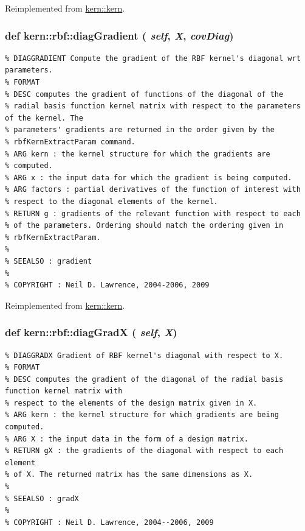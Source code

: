 Reimplemented from \hyperlink{classkern_1_1kern}{kern::kern}.\hypertarget{classkern_1_1rbf_0bcf6593046cfb84aef5f9e19b8c5ab5}{
\subsubsection[{diagGradient}]{\setlength{\rightskip}{0pt plus 5cm}def kern::rbf::diagGradient ( {\em self}, \/   {\em X}, \/   {\em covDiag})}}
\label{classkern_1_1rbf_0bcf6593046cfb84aef5f9e19b8c5ab5}




\footnotesize\begin{verbatim}% DIAGGRADIENT Compute the gradient of the RBF kernel's diagonal wrt parameters.
% FORMAT
% DESC computes the gradient of functions of the diagonal of the
% radial basis function kernel matrix with respect to the parameters of the kernel. The
% parameters' gradients are returned in the order given by the
% rbfKernExtractParam command.
% ARG kern : the kernel structure for which the gradients are
% computed.
% ARG x : the input data for which the gradient is being computed.
% ARG factors : partial derivatives of the function of interest with
% respect to the diagonal elements of the kernel.
% RETURN g : gradients of the relevant function with respect to each
% of the parameters. Ordering should match the ordering given in
% rbfKernExtractParam.
%
% SEEALSO : gradient
%
% COPYRIGHT : Neil D. Lawrence, 2004-2006, 2009

\end{verbatim}
\normalsize
 

Reimplemented from \hyperlink{classkern_1_1kern}{kern::kern}.\hypertarget{classkern_1_1rbf_eda4e0ee73de97348afe5ba685c6c8fe}{
\subsubsection[{diagGradX}]{\setlength{\rightskip}{0pt plus 5cm}def kern::rbf::diagGradX ( {\em self}, \/   {\em X})}}
\label{classkern_1_1rbf_eda4e0ee73de97348afe5ba685c6c8fe}




\footnotesize\begin{verbatim}% DIAGGRADX Gradient of RBF kernel's diagonal with respect to X.
% FORMAT
% DESC computes the gradient of the diagonal of the radial basis function kernel matrix with
% respect to the elements of the design matrix given in X.
% ARG kern : the kernel structure for which gradients are being computed.
% ARG X : the input data in the form of a design matrix.
% RETURN gX : the gradients of the diagonal with respect to each element
% of X. The returned matrix has the same dimensions as X.
%
% SEEALSO : gradX
%
% COPYRIGHT : Neil D. Lawrence, 2004--2006, 2009

\end{verbatim}
\normalsize
 


